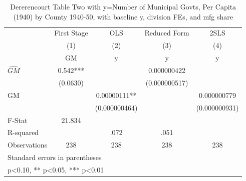 \begin{table}[htbp]\centering
\def\sym#1{\ifmmode^{#1}\else\(^{#1}\)\fi}
\caption{Dererencourt Table Two with y=Number of Municipal Govts, Per Capita (1940) by County 1940-50, with baseline y, division FEs, and mfg share}
\begin{tabular}{l*{4}{c}}
\toprule
                    & First Stage   &         OLS   &Reduced Form   &        2SLS   \\
                    &\multicolumn{1}{c}{(1)}&\multicolumn{1}{c}{(2)}&\multicolumn{1}{c}{(3)}&\multicolumn{1}{c}{(4)}\\
                    &\multicolumn{1}{c}{GM}&\multicolumn{1}{c}{y}&\multicolumn{1}{c}{y}&\multicolumn{1}{c}{y}\\
\midrule
$\hat{GM}$          &       0.542***&               & 0.000000422   &               \\
                    &    (0.0630)   &               &(0.000000517)   &               \\
\addlinespace
GM                  &               &  0.00000111** &               & 0.000000779   \\
                    &               &(0.000000464)   &               &(0.000000931)   \\
\midrule
F-Stat              &      21.834   &               &               &               \\
R-squared           &               &        .072   &        .051   &               \\
Observations        &         238   &         238   &         238   &         238   \\
\bottomrule
\multicolumn{5}{l}{\footnotesize Standard errors in parentheses}\\
\multicolumn{5}{l}{\footnotesize * p<0.10, ** p<0.05, *** p<0.01}\\
\end{tabular}
\end{table}
